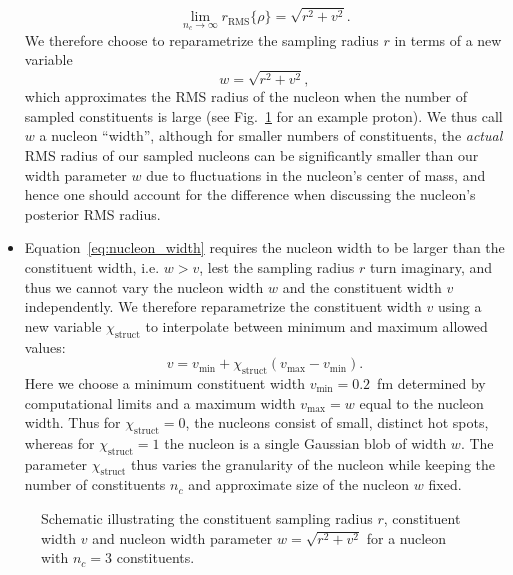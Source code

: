 \documentclass[aps,prc,reprint,amsmath,nofootinbib]{revtex4-1}
\newcommand{\X}{\chi_\text{struct}}
\begin{document}
\begin{itemize}[leftmargin=1\parindent]
\begin{equation}
      \lim_{n_c \to\infty} r_\mathrm{RMS}\{\rho\} = \sqrt{r^2 + v^2}.
    \end{equation}
    We therefore choose to reparametrize the sampling radius $r$ in terms of a new variable
    \begin{equation}
      \label{eq:nucleon_width}
      w = \sqrt{r^2 + v^2},
    \end{equation}
    which approximates the RMS radius of the nucleon when the number of sampled constituents is large (see Fig.~\ref{fig:nucleon_schematic} for an example proton).
    We thus call $w$ a nucleon ``width'', although for smaller numbers of constituents, the \emph{actual} RMS radius of our sampled nucleons can be significantly smaller than our width parameter $w$ due to fluctuations in the nucleon's center of mass, and hence one should account for the difference when discussing the nucleon's posterior RMS radius.
  \item
    Equation~\eqref{eq:nucleon_width} requires the nucleon width to be larger than the constituent width, i.e. $w > v$, lest the sampling radius $r$ turn imaginary, and thus we cannot vary the nucleon width $w$ and the constituent width $v$ independently.
    We therefore reparametrize the constituent width $v$ using a new variable $\X$ to interpolate between minimum and maximum allowed values:
    \begin{equation}
      \label{eq:struct_param}
      v = v_\mathrm{min} + \X (v_\mathrm{max} - v_\mathrm{min}).
    \end{equation}
    Here we choose a minimum constituent width $v_\mathrm{min} = 0.2$~fm determined by computational limits and a maximum width $v_\mathrm{max} = w$ equal to the nucleon width.
    Thus for $\X=0$, the nucleons consist of small, distinct hot spots, whereas for $\X=1$ the nucleon is a single Gaussian blob of width $w$.
    The parameter $\X$ thus varies the granularity of the nucleon while keeping the number of constituents $n_c$ and approximate size of the nucleon $w$ fixed.
\end{itemize}

\begin{figure}[t]
  \caption{
    \label{fig:nucleon_schematic}
    Schematic illustrating the constituent sampling radius $r$, constituent width $v$ and nucleon width parameter $w = \sqrt{r^2 + v^2}$ for a nucleon with $n_c=3$ constituents.
  }
\end{figure}
\end{document}
